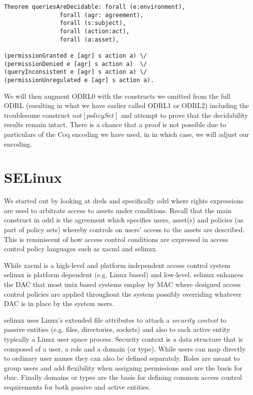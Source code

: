 \begin{minipage}[c]{0.95\textwidth}
\begin{lstlisting}
Theorem queriesAreDecidable: forall (e:environment), 
                forall (agr: agreement),
                forall (s:subject),
                forall (action:act),
                forall (a:asset),

(permissionGranted e [agr] s action a) \/
(permissionDenied e [agr] s action a)  \/
(queryInconsistent e [agr] s action a) \/
(permissionUnregulated e [agr] s action a).

\end{lstlisting}
\end{minipage}

We will then augment ODRL0 with the constructs we omitted from the full ODRL (resulting in what we have earlier called ODRL1 or ODRL2) including the troublesome construct $not[policySet]$ and attempt to prove that the decidability results remain intact. There is a chance that a proof is not possible due to particulars of the Coq encoding we have used, in in which case, we will adjust our encoding.

\section{SELinux}
 
We started out by looking at \ac{drel}s and specifically \ac{odrl} where rights expressions are used to arbitrate access to assets under conditions. Recall that the main construct in \ac{odrl} is the agreement which specifies users, asset(s) and policies (as part of policy sets) whereby controls on users' access to the assets are described. This is reminiscent of how access control conditions are expressed in access control policy languages such as \ac{xacml} and \ac{selinux}.

While \ac{xacml} is a high-level and platform independent access control system \ac{selinux} is platform dependent (e.g. Linux based) and low-level. \ac{selinux} enhances the \ac{DAC} that most unix based systems employ by \ac{MAC} where designed access control policies are applied throughout the system possibly overriding whatever \ac{DAC} is in place by the system users. 

\ac{selinux} uses Linux's extended file attributes to attach a \emph{security context} to passive entities (e.g. files, directories, sockets) and also to each active entity typically a Linux user space process. Security context is a data structure that is composed of a user, a role and a domain (or type). While users can map directly to ordinary user names they can also be defined separately. Roles are meant to group users and add flexibility when assigning permissions and are the basis for \ac{rbac}. Finally domains or types are the basis for defining common access control requirements for both passive and active entities. 


